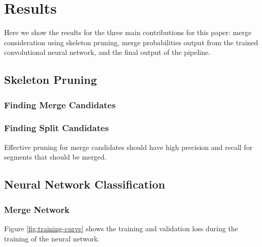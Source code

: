 \section{Results}

Here we show the results for the three main contributions for this paper: merge consideration using skeleton pruning, merge probabilities output from the trained convolutional neural network, and the final output of the pipeline. 

\subsection{Skeleton Pruning}

\subsubsection{Finding Merge Candidates}


\subsubsection{Finding Split Candidates}

Effective pruning for merge candidates should have high precision and recall for segments that should be merged.

\subsection{Neural Network Classification}

\subsubsection{Merge Network}





Figure \ref{fig:training-curve} shows the training and validation loss during the training of the neural network.

